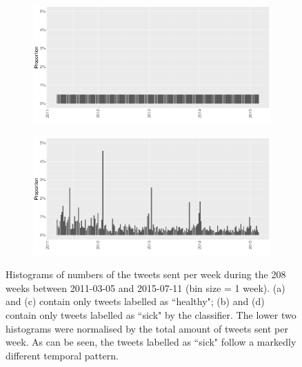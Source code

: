 \documentclass[11pt, a4paper,twoside]{report}\usepackage[]{graphicx}\usepackage[]{color}
\begin{document}
\begin{figure}[H]
    \begin{subfigure}[t]{0.49\textwidth}
  \includegraphics[width=1\linewidth]{activity_rel_healthy_date_Twitter_full_aggregated.png}
  \caption{}
  \end{subfigure}
  \hfill
    \begin{subfigure}[t]{0.49\textwidth}
  \includegraphics[width=1\linewidth]{activity_rel_sick_date_Twitter_full_aggregated.png}
  \caption{}
  \end{subfigure}
  \caption{Histograms of numbers of the tweets sent per week during the 208 weeks between 2011-03-05 and 2015-07-11 (bin size = 1 week). (a) and (c) contain only tweets labelled as ``healthy"; (b) and (d) contain only tweets labelled as ``sick" by the classifier. The lower two histograms were normalised by the total amount of tweets sent per week. As can be seen, the tweets labelled as ``sick" follow a markedly different temporal pattern.}
  \label{fig:tweets_seasonal_healthy_sick}
\end{figure}
\end{document}
